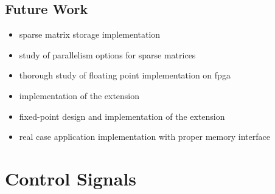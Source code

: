 \documentclass[mscthesis]{usiinfthesis}
\begin{document}
\section{Future Work}
\label{ch:conc_work}

\begin{itemize}
    \item sparse matrix storage implementation
    \item study of parallelism options for sparse matrices
    \item thorough study of floating point implementation on \gls{fpga}
    \item implementation of the extension
    \item fixed-point design and implementation of the extension
    \item real case application implementation with proper memory interface
\end{itemize}

\nocite{*}

\appendix %

\chapter{Control Signals}
\end{document}
